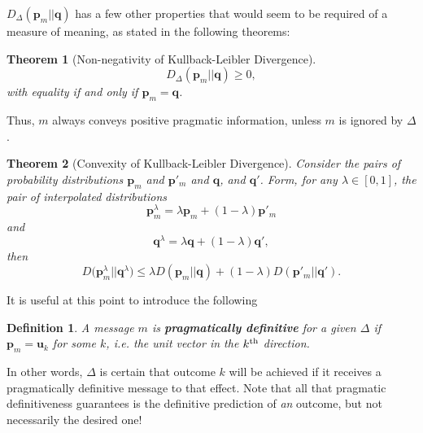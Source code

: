 \documentclass[11pt]{article}
\newtheorem*{definition}{Definition}
\newtheorem{theorem}{Theorem}[subsection]
\begin{document}
$D_\Delta(\mathbf p_m || \mathbf q)$ has a few other properties that would seem to be required of a measure of meaning, as stated in the following theorems:

\begin{theorem}[Non-negativity of Kullback-Leibler Divergence]\label{NonNegativity}
$$
D_\Delta(\mathbf p_m || \mathbf q) \geq 0,
$$
with equality if and only if $\mathbf p_m = \mathbf q$. 
\end{theorem}
Thus, $m$ always conveys positive pragmatic information, unless $m$ is ignored by $\Delta$.\\

\begin{theorem}[Convexity of Kullback-Leibler Divergence]
\label{DivergenceConvexity}
Consider the pairs of probability distributions $\mathbf p_m$ and $\mathbf p'_m$ and $\mathbf q$, and $\mathbf q'$.  Form, for any $\lambda \in [0, 1]$, the pair of interpolated distributions 
$$
\mathbf p_m^\lambda = \lambda \mathbf p_m + (1 - \lambda)\mathbf p'_m
$$
and 
$$
\mathbf q^\lambda = \lambda \mathbf q + (1 - \lambda)\mathbf q',
$$
then
$$
D\Big(\mathbf p_m^\lambda || \mathbf q^\lambda\Big) \leq 
\lambda D\left(\mathbf p_m || \mathbf q \right)+ (1-\lambda) D\left(\mathbf p'_m || \mathbf q' \right).
$$
\end{theorem}

It is useful at this point to introduce the following
\begin{definition}
A message $m$ is {\bf pragmatically definitive} for a given $\Delta$ if $\mathbf p_m = \mathbf u_k$ for some $k$, {\it i.e.} the unit vector in the $k^{\rm th}$ direction.
\end{definition}
In other words, $\Delta$ is certain that outcome $k$ will be achieved if it receives a pragmatically definitive message to that effect.  
Note that all that pragmatic definitiveness guarantees is the definitive prediction of {\it an} outcome, but not necessarily the desired one!\\
\end{document}
